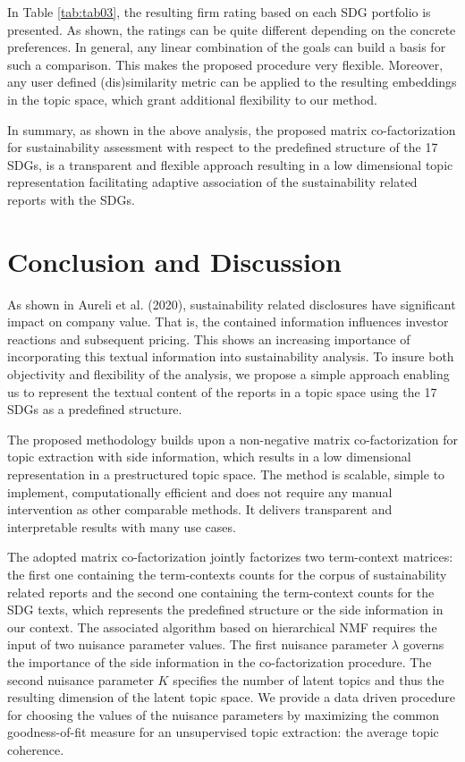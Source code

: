 \documentclass[
]{article}
\begin{document}
In Table \ref{tab:tab03}, the resulting firm rating based on each SDG portfolio is presented. As shown, the ratings can be quite different depending on the concrete preferences. In general, any linear combination of the goals can build a basis for such a comparison. This makes the proposed procedure very flexible. Moreover, any user defined (dis)similarity metric can be applied to the resulting embeddings in the topic space, which grant additional flexibility to our method.

In summary, as shown in the above analysis, the proposed matrix co-factorization for sustainability assessment with respect to the predefined structure of the 17 SDGs, is a transparent and flexible approach resulting in a low dimensional topic representation facilitating adaptive association of the sustainability related reports with the SDGs.

\hypertarget{conclusion-and-discussion}{%
\section{Conclusion and Discussion}\label{conclusion-and-discussion}}

As shown in Aureli et al. (2020), sustainability related disclosures have significant impact on company value. That is, the contained information influences investor reactions and subsequent pricing. This shows an increasing importance of incorporating this textual information into sustainability analysis. To insure both objectivity and flexibility of the analysis, we propose a simple approach enabling us to represent the textual content of the reports in a topic space using the 17 SDGs as a predefined structure.

The proposed methodology builds upon a non-negative matrix co-factorization for topic extraction with side information, which results in a low dimensional representation in a prestructured topic space. The method is scalable, simple to implement, computationally efficient and does not require any manual intervention as other comparable methods. It delivers transparent and interpretable results with many use cases.

The adopted matrix co-factorization jointly factorizes two term-context matrices: the first one containing the term-contexts counts for the corpus of sustainability related reports and the second one containing the term-context counts for the SDG texts, which represents the predefined structure or the side information in our context. The associated algorithm based on hierarchical NMF requires the input of two nuisance parameter values. The first nuisance parameter \(\lambda\) governs the importance of the side information in the co-factorization procedure. The second nuisance parameter \(K\) specifies the number of latent topics and thus the resulting dimension of the latent topic space. We provide a data driven procedure for choosing the values of the nuisance parameters by maximizing the common goodness-of-fit measure for an unsupervised topic extraction: the average topic coherence.
\end{document}
